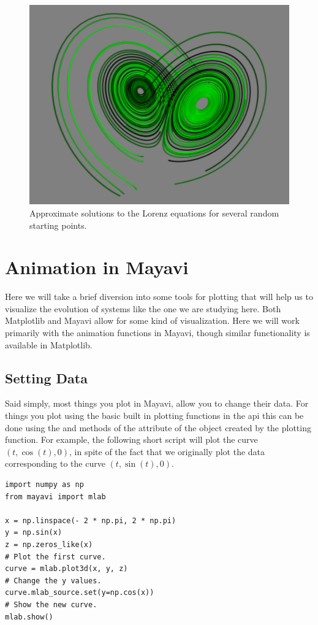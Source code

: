 \begin{figure}
\includegraphics[width=\textwidth]{lorenz_plot.pdf}
\caption{Approximate solutions to the Lorenz equations for several random starting points.}
\label{fig:lorenz_plot}
\end{figure}

\section*{Animation in Mayavi}
Here we will take a brief diversion into some tools for plotting that will help us to visualize the evolution of systems like the one we are studying here.
Both Matplotlib and Mayavi allow for some kind of visualization.
Here we will work primarily with the animation functions in Mayavi, though similar functionality is available in Matplotlib.

\subsection*{Setting Data}
Said simply, most things you plot in Mayavi, allow you to change their data.
For things you plot using the basic built in plotting functions in the  api this can be done using the  and  methods of the  attribute of the object created by the plotting function.
For example, the following short script will plot the curve $(t, \cos(t), 0)$, in spite of the fact that we originally plot the data corresponding to the curve $(t, \sin(t), 0)$.
\begin{lstlisting}
import numpy as np
from mayavi import mlab

x = np.linspace(- 2 * np.pi, 2 * np.pi)
y = np.sin(x)
z = np.zeros_like(x)
# Plot the first curve.
curve = mlab.plot3d(x, y, z)
# Change the y values.
curve.mlab_source.set(y=np.cos(x))
# Show the new curve.
mlab.show()
\end{lstlisting}

